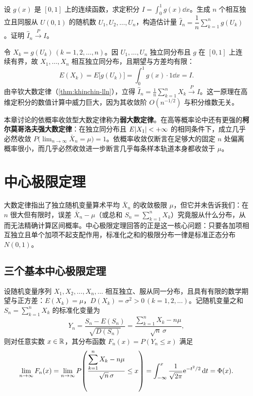 \begin{example}[title={蒙特卡洛（Monte Carlo）随机投点求积分}]
\label{eg:monte-carlo}
设 $g(x)$ 是 $[0,1]$ 上的连续函数，求定积分 $I=\int_{0}^{1}g(x)\dd x$。生成 $n$ 个相互独立且同服从 $U(0,1)$ 的随机数 $U_1,U_2,\ldots,U_n$，构造估计量 $\hat{I}_n=\dfrac{1}{n}\sum_{k=1}^{n}g(U_k)$。证明 $\hat{I}_n\xrightarrow{P} I$。
\begin{solution}
令 $X_k=g(U_k)\,(k=1,2,\ldots,n)$。因 $U_1,\ldots,U_n$ 独立同分布且 $g$ 在 $[0,1]$ 上连续有界，故 $X_1,\ldots,X_n$ 相互独立同分布，且期望与方差均有限：
\[
  E(X_k)=E\bigl[g(U_k)\bigr]=\int_{0}^{1}g(x)\cdot 1\dd x=I.
\]
由辛钦大数定律（\cref{thm:khinchin-lln}），立得 $\hat{I}_n=\frac{1}{n}\sum_{k=1}^{n}X_k\xrightarrow{P} I$。这一原理在高维定积分的数值计算中威力巨大，因为其收敛阶 $O(n^{-1/2})$ 与积分维数无关。
\end{solution}
\end{example}

\begin{remark}[弱大数定律与强大数定律]
本章讨论的依概率收敛型大数定律称为\textbf{弱大数定律}。在高等概率论中还有更强的\textbf{柯尔莫哥洛夫强大数定律}：在独立同分布且 $E\lvert X_1\rvert<+\infty$ 的相同条件下，成立几乎必然收敛 $P\bigl(\lim_{n\to\infty}\bar{X}_n=\mu\bigr)=1$。依概率收敛仅断言在足够大的固定 $n$ 处偏离概率很小，而几乎必然收敛进一步断言几乎每条样本轨道本身都收敛于 $\mu$。
\end{remark}

\section{中心极限定理}
\label{sec:central-limit}

大数定律指出了独立随机变量算术平均 $\bar{X}_n$ 的收敛极限 $\mu$，但它并未告诉我们：在 $n$ 很大但有限时，误差 $\bar{X}_n-\mu$（或总和 $S_n=\sum_{k=1}^{n}X_k$）究竟服从什么分布，从而无法精确计算区间概率。中心极限定理回答的正是这一核心问题：只要各加项相互独立且单个加项不起支配作用，标准化之和的极限分布一律是标准正态分布 $N(0,1)$。

\subsection{三个基本中心极限定理}

\begin{theorem}
\label{thm:lindeberg-levy}
设随机变量序列 $X_1,X_2,\ldots,X_n,\ldots$ 相互独立、服从同一分布，且具有有限的数学期望与正方差：$E(X_k)=\mu$，$D(X_k)=\sigma^2>0\,(k=1,2,\ldots)$。记随机变量之和 $S_n=\sum_{k=1}^{n}X_k$ 的标准化变量为
\[
  Y_n=\frac{S_n-E(S_n)}{\sqrt{D(S_n)}}=\frac{\displaystyle\sum_{k=1}^{n}X_k-n\mu}{\sqrt{n}\,\sigma},
\]
则对任意实数 $x\in\mathbb{R}$，其分布函数 $F_n(x)=P(Y_n\le x)$ 满足
\begin{equation}
  \lim_{n\to\infty}F_n(x)
  =\lim_{n\to\infty}P\!\left(\frac{\displaystyle\sum_{k=1}^{n}X_k-n\mu}{\sqrt{n}\,\sigma}\le x\right)
  =\int_{-\infty}^{x}\frac{1}{\sqrt{2\pi}}\mathrm{e}^{-t^2/2}\mathop{}\!\mathrm{d} t=\Phi(x).
  \label{eq:lindeberg-levy}
\end{equation}
\end{theorem}

